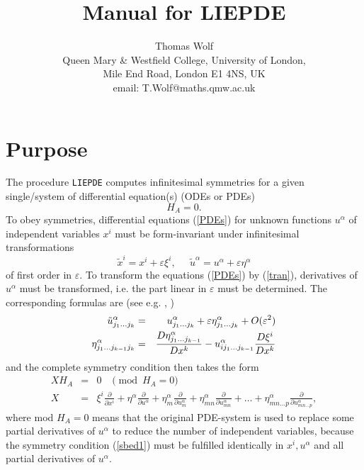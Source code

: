 \documentclass[12pt]{article}
\title{Manual for LIEPDE}
\author{Thomas Wolf\\ Queen Mary \& Westfield College, University of London, \\
     Mile End Road, London E1 4NS, UK \\  email: T.Wolf@maths.qmw.ac.uk}
\begin{document}
\maketitle
\section{Purpose}
The procedure {\tt LIEPDE} computes infinitesimal symmetries
for a given single/system of differential equation(s) (ODEs or PDEs)
\begin{equation}
H_A = 0.              \label{PDEs}
\end{equation}
To obey symmetries, differential equations (\ref{PDEs})
for unknown functions $u^\alpha$ of independent variables $x^i$
must be form-invariant under infinitesimal transformations
\begin{equation}
\tilde{x}^i = x^i + \varepsilon \xi^i, \;\; \;\;\;
	\tilde{u}^\alpha = u^\alpha + \varepsilon \eta^\alpha  \label{tran}
\end{equation}
of first order in $\varepsilon.$ To transform the equations (\ref{PDEs})
by (\ref{tran}), derivatives of $u^\alpha$ must be transformed, i.e. the part 
linear in $\varepsilon$ must be determined. The corresponding formulas are 
(see e.g. \cite{Olv}, \cite{Step})
\begin{eqnarray}
\tilde{u}^\alpha_{j_1\ldots j_k} & = &
u^\alpha_{j_1\ldots j_k} + \varepsilon
\eta^\alpha_{j_1\ldots j_k} + O(\varepsilon^2)  \nonumber \\ \vspace{3mm}
\eta^\alpha_{j_1\ldots j_{k-1}j_k} & = &
  \frac{D \eta^\alpha_{j_1\ldots j_{k-1}}}{D x^k} - 
  u^\alpha_{ij_1\ldots j_{k-1}}\frac{D \xi^i}{D x^k} \label{recur}
\end{eqnarray}
and the complete symmetry condition then takes the form
\begin{eqnarray}
X H_A & = & 0 \;\; \;\pmod{ H_A = 0}  \label{sbed1} \\
X & = & \xi^i \frac{\partial}{\partial x^i} +
 \eta^\alpha \frac{\partial}{\partial u^\alpha} +
 \eta^\alpha_m \frac{\partial}{\partial u^\alpha_m} +
 \eta^\alpha_{mn} \frac{\partial}{\partial u^\alpha_{mn}} + \ldots +
 \eta^\alpha_{mn\ldots p} \frac{\partial}{\partial u^\alpha_{mn\ldots p}} ,
\label{sbed2}
\end{eqnarray}
where mod $H_A = 0$ means that the original PDE-system is used to replace
some partial derivatives of $u^\alpha$ to reduce the number of independent
variables, because the symmetry condition (\ref{sbed1}) must be 
fulfilled identically in $x^i, u^\alpha$ and all partial
derivatives of $u^\alpha.$
\end{document}
